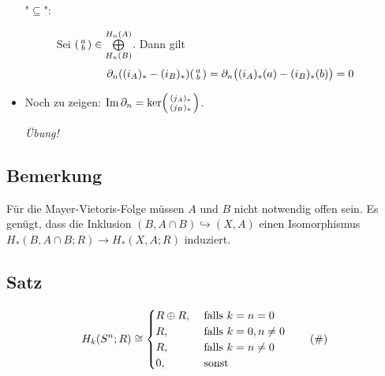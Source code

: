 \begin{itemize}
\begin{description}
		\item["$\subseteq$":] Sei $\begin{psmallmatrix} a \\ b \end{psmallmatrix} \in \bigoplus\limits_{H_n(B)}^{H_n(A)}$. Dann gilt
		\[
			\partial_n \enbrace*{(i_A)_* - (i_B)_*}  \begin{psmallmatrix} a \\ b \end{psmallmatrix} = \partial_n \enbrace[\big]{(i_A)_*(a)- (i_B)_*(b)}  =0
		\]
	\end{description}
	\item Noch zu zeigen: $\operatorname{Im} \partial_n = \ker \begin{psmallmatrix} (j_A)_* \\ (j_B)_* \end{psmallmatrix}$.
	
	\emph{Übung!}
\end{itemize}

\subsection[Bemerkung zur Mayer-Vietoris-Folge]{Bemerkung} %
\label{sub:93}
Für die Mayer-Vietoris-Folge müssen $A$ und $B$ nicht notwendig offen sein. Es genügt, dass die Inklusion $(B,A \cap B) \hookrightarrow (X,A)$ einen Isomorphismus
$H_*(B,A \cap B;R) \to H_*(X,A;R)$ induziert.

\subsection[Satz: Homologie der Sphäre $S^n$]{Satz} %
\label{sub:94}
\begin{equation*}
	H_k \enbrace*{S^n ;R} \cong \begin{cases}
		R \oplus R , &\text{ falls }k=n=0\\
		R, &\text{ falls } k=0, n \not= 0 \\
		R, &\text{ falls } k=n\not= 0 \\
		0, &\text{ sonst}
	\end{cases} \label{eq:94} \tag{\#}
\end{equation*}

